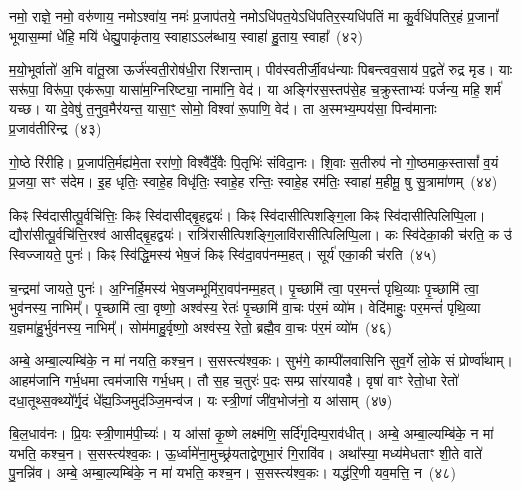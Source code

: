 {\anuvakamend[{वि॒वि॒दद्द्वे च॑}]}%

नमो॒ राज्ञे॒ नमो॒ वरु॑णाय॒ नमो\-ऽश्वा॑य॒ नमः॑ प्र॒जाप॑तये॒ नमो\-ऽधि॑पत॒ये\-ऽधि॑पतिर॒स्यधि॑पतिं मा कु॒र्वधि॑पतिर॒हं प्र॒जानां᳚ भूयास॒म्मां धे॑हि॒ मयि॑ धेह्यु॒पाकृ॑ताय॒ स्वाहा\-ऽ\-ऽल॑ब्धाय॒ स्वाहा॑ हु॒ताय॒ स्वाहा᳚~(४२)

{\anuvakamend[{नम॒ एका॒न्नत्रि॒ꣳ॒शत्}]}%

म॒यो॒भूर्वातो॑ अ॒भि वा॑तू॒स्रा ऊर्ज॑स्वती॒रोष॑धी॒रा रि॑शन्ताम्। पीव॑स्वतीर्जी॒वध॑न्याः पिबन्त्वव॒साय॑ प॒द्वते॑ रुद्र मृड। याः सरू॑पा॒ विरू॑पा॒ एक॑रूपा॒ यासा॑म॒ग्निरिष्ट्या॒ नामा॑नि॒ वेद॑। या अङ्गि॑रस॒स्तप॑से॒ह च॒क्रुस्ताभ्यः॑ पर्जन्य॒ महि॒ शर्म॑ यच्छ। या दे॒वेषु॑ त॒नुव॒मैर॑यन्त॒ यासा॒ꣳ॒ सोमो॒ विश्वा॑ रू॒पाणि॒ वेद॑। ता अ॒स्मभ्य॒म्पय॑सा॒ पिन्व॑मानाः प्र॒जाव॑तीरिन्द्र~(४३)

गो॒ष्ठे रि॑रीहि। प्र॒जाप॑ति॒र्मह्य॑मे॒ता ररा॑णो॒ विश्वै᳚र्दे॒वैः पि॒तृभिः॑ संविदा॒नः। शि॒वाः स॒तीरुप॑ नो गो॒ष्ठमाक॒स्तासां᳚ व॒यं प्र॒जया॒ सꣳ स॑देम। इ॒ह धृतिः॒ स्वाहे॒ह विधृ॑तिः॒ स्वाहे॒ह रन्तिः॒ स्वाहे॒ह रम॑तिः॒ स्वाहा॑ म॒हीमू॒ षु सु॒त्रामा॑णम्~(४४)

{\anuvakamend[{इ॒न्द्रा॒ष्टात्रिꣳ॑शच्च}]}%

किꣴ स्वि॑दासीत्पू॒र्वचि॑त्तिः॒ किꣴ स्वि॑दासीद्बृ॒हद्वयः॑। किꣴ स्वि॑दासीत्पिशङ्गि॒ला किꣴ स्वि॑दासीत्पिलिप्पि॒ला। द्यौरा॑सीत्पू॒र्वचि॑त्ति॒रश्व॑ आसीद्बृ॒हद्वयः॑। रात्रि॑रासीत्पिशङ्गि॒लावि॑रासीत्पिलिप्पि॒ला। कः स्वि॑देका॒की च॑रति॒ क उ॑ स्विज्जायते॒ पुनः॑। किꣴ स्वि॑द्धि॒मस्य॑ भेष॒जं किꣴ स्वि॑दा॒वप॑नम्म॒हत्। सूर्य॑ एका॒की च॑रति~(४५)

च॒न्द्रमा॑ जायते॒ पुनः॑। अ॒ग्निर्\mbox{}हि॒मस्य॑ भेष॒जम्भूमि॑रा॒वप॑नम्म॒हत्। पृ॒च्छामि॑ त्वा॒ पर॒मन्तं॑ पृथि॒व्याः पृ॒च्छामि॑ त्वा॒ भुव॑नस्य॒ नाभिम्᳚। पृ॒च्छामि॑ त्वा॒ वृष्णो॒ अश्व॑स्य॒ रेतः॑ पृ॒च्छामि॑ वा॒चः प॑र॒मं व्यो॑म। वेदि॑माहुः॒ पर॒मन्तं॑ पृथि॒व्या य॒ज्ञमा॑हु॒र्भुव॑नस्य॒ नाभिम्᳚। सोम॑माहु॒र्वृष्णो॒ अश्व॑स्य॒ रेतो॒ ब्रह्मै॒व वा॒चः प॑र॒मं व्यो॑म~(४६)

{\anuvakamend[{सूर्य॑ एका॒की च॑रति॒ षट्च॑त्वारिꣳशच्च}]}%

अम्बे॒ अम्बा॒ल्यम्बि॑के॒ न मा॑ नयति॒ कश्च॒न। स॒सस्त्य॑श्व॒कः। सुभ॑गे॒ काम्पी॑लवासिनि सुव॒र्गे लो॒के सं प्रोर्ण्वा॑थाम्। आहम॑जानि गर्भ॒धमा त्वम॑जासि गर्भ॒धम्। तौ स॒ह च॒तुरः॑ प॒दः सम्प्र सा॑रयावहै। वृषा॑ वाꣳ रेतो॒धा रेतो॑ दधा॒तूथ्स॒क्थ्यो᳚र्गृ॒दं धे᳚ह्य॒ञ्जिमुद॑ञ्जि॒मन्व॑ज। यः स्त्री॒णां जी॑व॒भोज॑नो॒ य आ॑साम्~(४७)

बि॒ल॒धाव॑नः। प्रि॒यः स्त्री॒णाम॑पी॒च्यः॑। य आ॑सां कृ॒ष्णे लक्ष्म॑णि॒ सर्दि॑गृदिम्प॒राव॑धीत्। अम्बे॒ अम्बा॒ल्यम्बि॑के॒ न मा॑ यभति॒ कश्च॒न। स॒सस्त्य॑श्व॒कः। ऊ॒र्ध्वामे॑ना॒मुच्छ्र॑यताद्वेणुभा॒रं गि॒रावि॑व। अथा᳚स्या॒ मध्य॑मेधताꣳ शी॒ते वाते॑ पु॒नन्नि॑व। अम्बे॒ अम्बा॒ल्यम्बि॑के॒ न मा॑ यभति॒ कश्च॒न। स॒सस्त्य॑श्व॒कः। यद्ध॑रि॒णी यव॒मत्ति॒ न~(४८)

